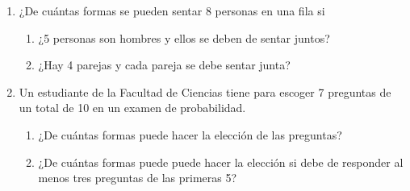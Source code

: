 \documentclass[12pt,a4paper]{report}
\begin{document}
\begin{enumerate}
{		Digamos que queremos formar subconjuntos de $S$ que contengan a un elemento
		$s \in S$.
		Hay $2^n$ subconjunto de S. Además, todos los subconjuntos de $S$ que no
		contengan a $s$ son también subconjuntos de $S / {s}$, que tiene $2^(n-1)$
		posibles subconjuntos. Entonces la cantidad de subconjuntos de $S$ que
		contienen a $s$ son $2^n - 2^(n-1) = 2^n - 2^n * 2^-1 = 2^n(1 - 2^-1) =
		2^n(2^-1) = 2^(n-1)$
		Y la proporción de subconjuntos que lo cumplen son $\frac{2^⁽n-1), 2^n} =
		 \frac{2^n * 2^-1, 2^n} = 2^-1 = \frac{1, 2}$\\
	}

   \item {
    ¿De cuántas formas se pueden sentar 8 personas en una fila si\\

	\begin{enumerate}
   \item {
   ¿5 personas son hombres y ellos se deben de sentar juntos?\\

   }

   \item {
   ¿Hay 4 parejas y cada pareja se debe sentar junta?\\

   }

	\end{enumerate}

    }

   \item {
    Un estudiante de la Facultad de Ciencias tiene para escoger 7 preguntas
    de un total de 10 en un examen de probabilidad.\\

	\begin{enumerate}
   \item {
   ¿De cuántas formas puede hacer la elección de las preguntas?\\

   }

   \item {
   ¿De cuántas formas puede puede hacer la elección si debe de responder
   al menos tres preguntas de las primeras 5?\\

   }
	\end{enumerate}
    }
\end{enumerate}
\end{document}
